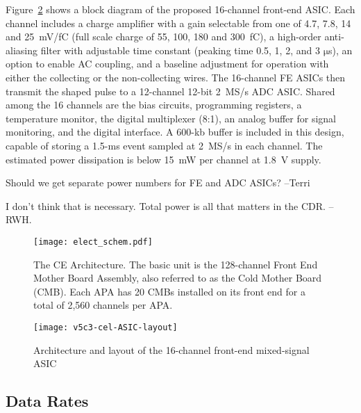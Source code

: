 Figure~\ref{fig:ce-elec-asic-layout} shows a block diagram of the proposed 16-channel front-end ASIC.
Each channel includes a charge amplifier with a gain selectable from one of 4.7, 7.8, 14 and 25~mV/fC
(full scale charge of 55, 100, 180 and 300~fC),
a high-order anti-aliasing filter with adjustable time
constant (peaking time 0.5, 1, 2, and 3 $\mathrm{\mu}$s),
an option to enable AC coupling,
and a baseline adjustment for operation with either the collecting or the non-collecting wires.
The 16-channel FE ASICs then transmit the shaped pulse to a 12-channel 12-bit 2~MS/s ADC ASIC.
Shared among the 16 channels are the bias circuits, programming registers,
a temperature monitor, the digital multiplexer (8:1),
an analog buffer for signal monitoring, and the digital interface.
A 600-kb buffer is included in this design, capable of storing a 1.5-ms 
event sampled at 2~MS/s in each channel.
The estimated power dissipation is below 15~mW per channel at 1.8~V supply.

\begin{editornote}
  Should we get separate power numbers for FE and ADC ASICs? --Terri

  I don't think that is necessary.  Total power is all that matters in the CDR.  -- RWH.
\end{editornote}

\begin{figure}[htbp]
\centering
\texttt{[image: elect\_schem.pdf]}
\caption{
  The CE Architecture.
  The basic unit is the 128-channel Front End Mother Board Assembly, also referred to as the Cold Mother Board (CMB).
  Each APA has 20 CMBs installed on its front end for a total of 2,560 channels per APA.
}
\label{fig:ce-elec-schematic}
\end{figure}
\begin{figure}[htbp]
\centering
\texttt{[image: v5c3-cel-ASIC-layout]}
\caption{Architecture and layout of the 16-channel front-end mixed-signal ASIC}
\label{fig:ce-elec-asic-layout}
\end{figure}

%
\subsection{Data Rates}
\label{subsec:fe-arch-rates}

